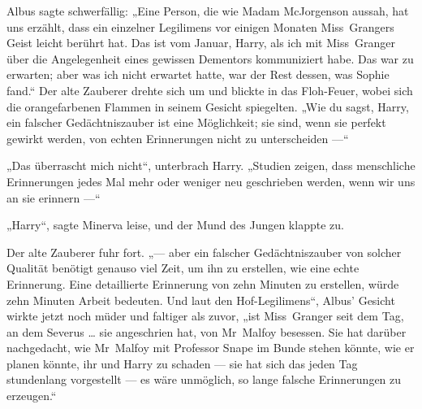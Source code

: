 Albus sagte schwerfällig:
„Eine Person, die wie Madam McJorgenson aussah, hat uns erzählt, dass ein einzelner Legilimens vor einigen Monaten Miss~Grangers Geist leicht berührt hat. Das ist vom Januar, Harry, als ich mit Miss~Granger über die Angelegenheit eines gewissen Dementors kommuniziert habe. Das war zu erwarten; aber was ich nicht erwartet hatte, war der Rest dessen, was Sophie fand.“ Der alte Zauberer drehte sich um und blickte in das Floh-Feuer, wobei sich die orangefarbenen Flammen in seinem Gesicht spiegelten.
„Wie du sagst, Harry, ein falscher Gedächtniszauber ist eine Möglichkeit; sie sind, wenn sie perfekt gewirkt werden, von echten Erinnerungen nicht zu unterscheiden —“

„Das überrascht mich nicht“, unterbrach Harry.
„Studien zeigen, dass menschliche Erinnerungen jedes Mal mehr oder weniger neu geschrieben werden, wenn wir uns an sie erinnern —“

„Harry“, sagte Minerva leise, und der Mund des Jungen klappte zu.

Der alte Zauberer fuhr fort. „— aber ein falscher Gedächtniszauber von solcher Qualität benötigt genauso viel Zeit, um ihn zu erstellen, wie eine echte Erinnerung. Eine detaillierte Erinnerung von zehn Minuten zu erstellen, würde zehn Minuten Arbeit bedeuten. Und laut den Hof-Legilimens“, Albus’ Gesicht wirkte jetzt noch müder und faltiger als zuvor, „ist Miss~Granger seit dem Tag, an dem Severus … sie angeschrien hat, von Mr~Malfoy besessen. Sie hat darüber nachgedacht, wie Mr~Malfoy mit Professor Snape im Bunde stehen könnte, wie er planen könnte, ihr und Harry zu schaden — sie hat sich das jeden Tag stundenlang vorgestellt — es wäre unmöglich, so lange falsche Erinnerungen zu erzeugen.“


